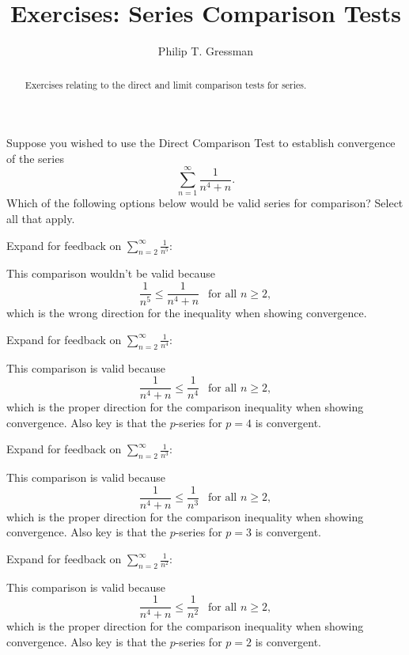 \documentclass{ximera}
\title{Exercises: Series Comparison Tests}
\author{Philip T. Gressman}
\begin{document}
\begin{abstract}
Exercises relating to the direct and limit comparison tests for series.
\end{abstract}
\maketitle

\begin{exercise}
Suppose you wished to use the Direct Comparison Test to establish convergence of the series
\[ \sum_{n=1}^\infty \frac{1}{n^4 + n}. \]
Which of the following options below would be valid series for comparison? Select all that apply.
\begin{multipleChoice}
\end{multipleChoice}
\begin{feedback}
Expand for feedback on {$\displaystyle \sum_{n=2}^\infty \frac{1}{n^5}$}:
\begin{expandable}
This comparison wouldn't be valid because
\[ \frac{1}{n^5} \leq \frac{1}{n^4+n} \ \ \text{ for all } n \geq 2,\]
which is the wrong direction for the inequality when showing convergence.
\end{expandable}

Expand for feedback on {$\displaystyle \sum_{n=2}^\infty \frac{1}{n^4}$}:
\begin{expandable}
This comparison is valid because
\[ \frac{1}{n^4+n} \leq \frac{1}{n^4}  \ \ \text{ for all } n \geq 2,\]
which is the proper direction for the comparison inequality when showing convergence. Also key is that the $p$-series for $p=4$ is convergent.
\end{expandable}

Expand for feedback on {$\displaystyle \sum_{n=2}^\infty \frac{1}{n^3}$}:
\begin{expandable}
This comparison is valid because
\[ \frac{1}{n^4+n} \leq \frac{1}{n^3}  \ \ \text{ for all } n \geq 2, \]
which is the proper direction for the comparison inequality when showing convergence. Also key is that the $p$-series for $p=3$ is convergent.
\end{expandable}

Expand for feedback on {$\displaystyle \sum_{n=2}^\infty \frac{1}{n^2}$}:
\begin{expandable}
This comparison is valid because
\[ \frac{1}{n^4+n} \leq \frac{1}{n^2}  \ \ \text{ for all } n \geq 2, \]
which is the proper direction for the comparison inequality when showing convergence. Also key is that the $p$-series for $p=2$ is convergent.
\end{expandable}


\end{feedback}
\end{exercise}
\end{document}
